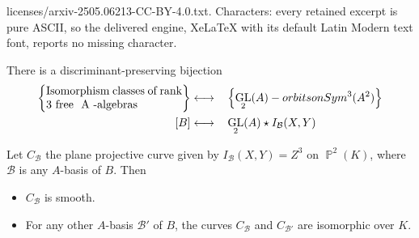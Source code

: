 \documentclass[10pt,a4paper]{amsart}
\DeclareMathOperator{\gl}{GL}
\DeclareMathOperator{\pp}{\mathbb{P}}
\newcommand{\syma}{\textnormal{Sym}^3(A^2)}
\begin{document}
licenses/arxiv-2505.06213-CC-BY-4.0.txt. Characters: every retained excerpt is pure ASCII, so the delivered engine, XeLaTeX with its default Latin Modern text font, reports no missing character.
\begin{proposition}
    \label{proposition: GGS bijection}
    There is a discriminant-preserving bijection 
    \begin{alignat*}{4}
        \left\{\parbox{12em}{\textnormal{Isomorphism classes of rank 3            free } A \textnormal{-algebras}}\right\}&\longleftrightarrow&&\left\{\gl_2(A)-\textnormal{orbits on }\syma\right\}\\
        [B]&\longleftrightarrow&&\gl_2(A)\star I_{\mathcal{B}}(X,Y)
    \end{alignat*}
\end{proposition}

\begin{lemma} Let $C_{\mathcal{B}}$ the plane projective curve given by  $I_{\mathcal{B}}(X,Y) = Z^3$ on $\pp^2(K)$, where $\mathcal{B}$ is any $A$-basis of $B$.  Then
\begin{itemize}
    \item[a)]  $C_{\mathcal{B}}$ is smooth. 
\item[b)] For any other $A$-basis $\mathcal{B}'$ of $B$, the curves $C_{\mathcal{B}}$ and $C_{\mathcal{B}'}$ are isomorphic over $K$.
\end{itemize}
\end{lemma}
\end{document}
